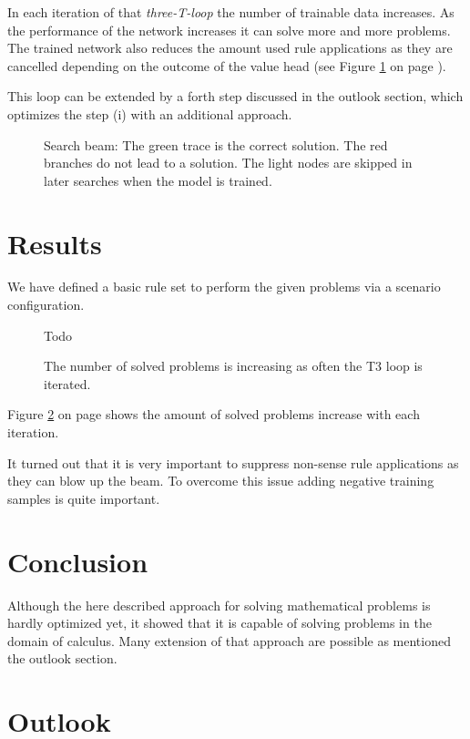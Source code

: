 \documentclass{scrartcl}
\theoremstyle{definition}
\begin{document}
In each iteration of that \textit{three-T-loop} the number of trainable data increases. 
As the performance of the network increases it can solve more and more problems.
The trained network also reduces the amount used rule applications as they are cancelled depending on the outcome of the value head (see Figure \ref{fig:beam_search} on page \pageref{fig:beam_search}). 


This loop can be extended by a forth step discussed in the outlook section, which optimizes the step (i) with an additional approach.

\begin{figure}[!htbp]
	\centering
	
	\caption{Search beam: The green trace is the correct solution.
	The red branches do not lead to a solution.
	The light nodes are skipped in later searches when the model is trained.}
	\label{fig:beam_search}
\end{figure}


\section{Results}

We have defined a basic rule set to perform the given problems via a scenario configuration.

\begin{figure}[!htbp]
	\centering
	Todo
	\caption{The number of solved problems is increasing as often the T3 loop is iterated.}
	\label{fig:t3loop_performance}
\end{figure}

Figure \ref{fig:t3loop_performance} on page \pageref{fig:t3loop_performance} shows the amount of solved problems increase with each iteration. 

It turned out that it is very important to suppress non-sense rule applications as they can blow up the beam.
To overcome this issue adding negative training samples is quite important.

\section{Conclusion}

Although the here described approach for solving mathematical problems is hardly optimized yet,
it showed that it is capable of solving problems in the domain of calculus.
Many extension of that approach are possible  as mentioned the outlook section.

\section{Outlook}
\end{document}
